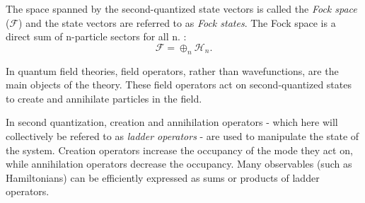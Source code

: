 The space spanned by the second-quantized state vectors is called the \textit{Fock space} ($\mathcal{F}$) and the state vectors are referred to as \textit{Fock states}.
The Fock space is a direct sum of n-particle sectors for all n. \cite{Schwartz_2013}:
\begin{equation}
    \mathcal{F} = \oplus_n \mathcal{H}_n.
\end{equation}


In quantum field theories, field operators, rather than wavefunctions, are the main objects of the theory. These field operators act on second-quantized states to create and annihilate particles in the field. 

In second quantization, creation and annihilation operators - which here will collectively be refered to as \emph{ladder operators} - are used to manipulate the state of the system.
Creation operators increase the occupancy of the mode they act on, while annihilation operators decrease the occupancy.
Many observables (such as Hamiltonians) can be efficiently expressed as sums or products of ladder operators.  




